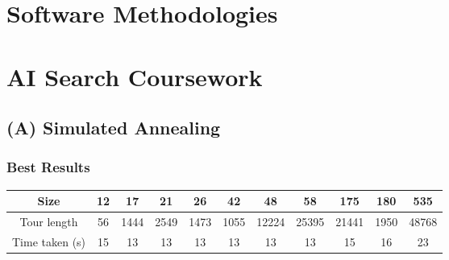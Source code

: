 \documentclass[11pt]{article}
\begin{document}
	\section*{Software Methodologies}
	\section*{AI Search Coursework}
	\normalsize
	
	\subsection*{(A) Simulated Annealing}
	
		\subsubsection*{Best Results}
			\begin{center}
				\begin{tabular}{| c | c | c | c | c | c | c | c | c | c | c |}
					\hline
					Size & 12 & 17 & 21 & 26 & 42 & 48 & 58 & 175 & 180 & 535 \\
					\hline
					Tour length & 56 & 1444 & 2549 & 1473 & 1055 & 12224 & 25395 & 21441 & 1950 & 48768 \\
					\hline		
					Time taken (s) & 15 & 13 & 13 & 13 & 13 & 13 & 13 & 15 & 16 & 23 \\
					\hline
				\end{tabular}
			\end{center}
\end{document}
